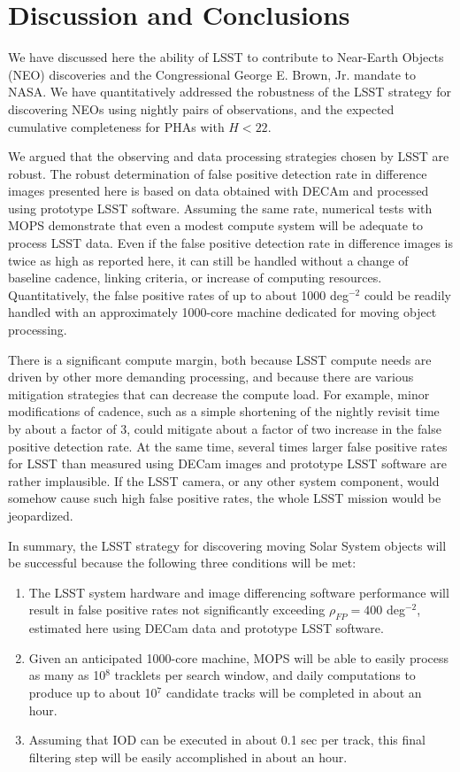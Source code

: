 

\section{Discussion and Conclusions}

We have discussed here the ability of LSST to contribute to Near-Earth Objects (NEO) discoveries and
the Congressional George E. Brown, Jr. mandate to NASA. We have quantitatively addressed
the robustness of the LSST strategy for discovering NEOs using nightly pairs of observations, and
the expected cumulative completeness for PHAs with $H<22$.

We argued that the observing and data processing strategies chosen by LSST are robust. The
robust determination of false positive detection rate in difference images presented here is based
on data obtained with DECAm and processed using prototype LSST software. Assuming the same rate,
numerical tests with MOPS demonstrate that even a modest compute system will be adequate to
process LSST data. Even if the false positive detection rate in difference images is twice as high as
reported here, it can still be handled without a change of baseline cadence, linking criteria, or
increase of computing resources. Quantitatively, the false positive rates of up to about
1000 deg$^{-2}$ could be readily handled with an approximately 1000-core machine dedicated for
moving object processing.

There is a significant compute margin, both because LSST compute needs are driven by other more
demanding processing, and because there are various mitigation strategies that can decrease the
compute load. For example, minor modifications of cadence, such as a simple shortening
of the nightly revisit time by about a factor of 3, could mitigate about a factor of two increase in
the false positive detection rate. At the same time, several times larger false positive rates for LSST
than measured using DECam images and prototype LSST software are rather implausible. If the
LSST camera, or any other system component, would somehow cause such high false positive rates,
the whole LSST mission would be jeopardized.

In summary, the LSST strategy for discovering moving Solar System objects will be successful
because the following three conditions will be met:
\begin{enumerate}
\item The LSST system hardware and image differencing software performance will result in false positive
          rates not significantly exceeding $\rho_{FP} =  400$ deg$^{-2}$, estimated here using DECam data
          and prototype LSST software.
\item Given an anticipated 1000-core machine, MOPS will be able to easily process as many as
         10$^8$ tracklets per search window, and daily computations to produce up to about 10$^7$
         candidate tracks will be completed in about an hour.
\item Assuming that IOD can be executed in about 0.1 sec per track, this final filtering step will
         be easily accomplished in about an hour.
\end{enumerate}


